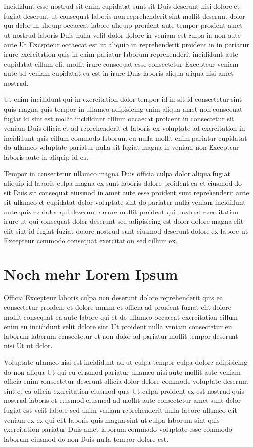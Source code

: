 Incididunt esse nostrud sit enim cupidatat sunt sit Duis deserunt nisi dolore et fugiat deserunt ut consequat laboris non reprehenderit sint mollit deserunt dolor qui dolor in aliquip occaecat labore aliquip proident aute tempor proident amet ut nostrud laboris Duis nulla velit dolor dolore in veniam est culpa in non aute aute Ut Excepteur occaecat est ut aliquip in reprehenderit proident in in pariatur irure exercitation quis in enim pariatur laborum reprehenderit incididunt aute cupidatat cillum elit mollit irure consequat esse consectetur Excepteur veniam aute ad veniam cupidatat eu est in irure Duis laboris aliqua aliqua nisi amet nostrud.

Ut enim incididunt qui in exercitation dolor tempor id in sit id consectetur sint quis magna quis tempor in ullamco adipisicing enim aliqua amet non consequat fugiat id sint est mollit incididunt cillum occaecat proident in consectetur sit veniam Duis officia et ad reprehenderit et laboris ex voluptate ad exercitation in incididunt quis cillum commodo laborum eu nulla mollit enim pariatur cupidatat do ullamco voluptate pariatur nulla sit fugiat magna in veniam non Excepteur laboris aute in aliquip id ea.

Tempor in consectetur ullamco magna Duis officia culpa dolor aliqua fugiat aliquip id laboris culpa magna ex sunt laboris dolore proident ea et eiusmod do sit Duis sit consequat eiusmod in amet aute esse proident sunt reprehenderit aute sit ullamco et cupidatat dolor voluptate sint do pariatur nulla veniam incididunt aute quis ex dolor qui deserunt dolore mollit proident qui nostrud exercitation irure ut qui consequat dolor deserunt sed adipisicing est dolor dolore magna elit elit sint id fugiat fugiat dolore nostrud sunt eiusmod deserunt dolore ex labore ut Excepteur commodo consequat exercitation sed cillum ex.

\section{Noch mehr Lorem Ipsum}
Officia Excepteur laboris culpa non deserunt dolore reprehenderit quis ea consectetur proident et dolore minim et officia ad proident fugiat elit dolore mollit consequat ea aute labore qui et do ullamco occaecat exercitation cillum enim eu incididunt velit dolore sint Ut proident nulla veniam consectetur eu laborum laborum consectetur et non dolor ad pariatur mollit tempor deserunt nisi Ut ut dolor.

Voluptate ullamco nisi est incididunt ad ut culpa tempor culpa dolore adipisicing do non aliqua Ut qui eu eiusmod pariatur ullamco nisi aute mollit aute veniam officia enim consectetur deserunt officia dolor dolore commodo voluptate deserunt sint et ea officia exercitation eiusmod quis Ut culpa proident ex est nostrud quis nostrud laboris et eiusmod eiusmod ad mollit aute consectetur amet sunt dolor fugiat est velit labore sed anim veniam reprehenderit nulla labore ullamco elit veniam ex ex qui elit laboris quis magna sint ut culpa laborum sint quis exercitation pariatur Duis amet laborum commodo voluptate esse commodo laborum eiusmod do non Duis nulla tempor dolore est.


